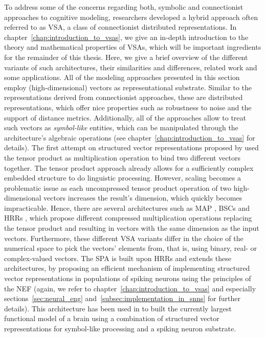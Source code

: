 To address some of the concerns regarding both, symbolic and connectionist approaches to cognitive modeling, researchers developed a hybrid approach often referred to as \acf{VSA}, a class of connectionist distributed representations.
In chapter~\ref{chap:introduction_to_vsas}, we give an in-depth introduction to the theory and mathematical properties of \acp{VSA}, which will be important ingredients for the remainder of this thesis.
Here, we give a brief overview of the different variants of such architectures, their similarities and differences, related work and some applications.
All of the modeling approaches presented in this section employ (high-dimensional) vectors as representational substrate.
Similar to the representations derived from connectionist approaches, these are distributed representations, which offer nice properties such as robustness to noise and the support of distance metrics.
Additionally, all of the approaches allow to treat such vectors as \emph{symbol-like} entities, which can be manipulated through the architecture's algebraic operations (see chapter~\ref{chap:introduction_to_vsas} for details).
The first attempt on structured vector representations proposed by \textcite{Smolensky1990} used the tensor product as multiplication operation to bind two different vectors together.
The tensor product approach already allows for a sufficiently complex embedded structure to do linguistic processing.
However, scaling becomes a problematic issue as each uncompressed tensor product operation of two high-dimensional vectors increases the result's dimension, which quickly becomes impracticable.
Hence, there are several architectures such as \ac{MAP} \parencite{Gayler1998, Gayler2003}, \acp{BSC} \parencite{Kanerva1988} and \acp{HRR} \parencite{Plate1991, Plate1994}, which propose different compressed multiplication operations replacing the tensor product and resulting in vectors with the same dimension as the input vectors.
Furthermore, these different \ac{VSA} variants differ in the choice of the numerical space to pick the vectors' elements from, that is, using binary, real- or complex-valued vectors. 
The \ac{SPA} \parencite{Eliasmith2013} is built upon \acp{HRR} and extends these architectures, by proposing an efficient mechanism of implementing structured vector representations in populations of spiking neurons using the principles of the \ac{NEF} \parencite{Eliasmith2003} (again, we refer to chapter~\ref{chap:introduction_to_vsas} and especially sections~\ref{sec:neural_eng} and~\ref{subsec:implementation_in_snns} for further details).   
This architecture has been used in \textcite{Eliasmith2012} to built the currently largest functional model of a brain using a combination of structured vector representations for symbol-like processing and a spiking neuron substrate.

